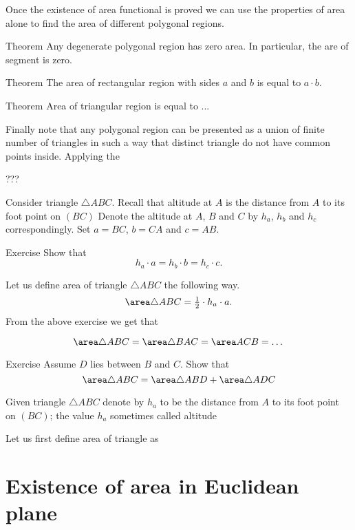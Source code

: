 Once the existence of area functional is proved we can use the properties of area alone to find the area of different polygonal regions.

\begin{thm}{Theorem}
Any degenerate polygonal region has zero area.
In particular, the are of segment is zero.
\end{thm}


\begin{thm}{Theorem}
The area of rectangular region with sides $a$ and $b$ is equal to $a\cdot b$. 
\end{thm}


\begin{thm}{Theorem}
Area of triangular region is equal to ...
\end{thm}

Finally note that any polygonal region can be presented as a union of finite number of triangles in such a way that distinct triangle do not have common points inside.
Applying the 

???

Consider triangle $\triangle ABC$.
Recall that altitude at $A$ is the distance from $A$ to its foot point on $(BC)$
Denote the altitude at $A$, $B$ and $C$ by $h_a$, $h_b$ and $h_c$ correspondingly.
Set $a=BC$, $b=CA$ and $c=AB$.

\begin{thm}{Exercise}
Show that 
$$h_a\cdot a=h_b\cdot b=h_c\cdot c.$$
\end{thm}


Let us define area of triangle $\triangle ABC$ the following way.
$$\area \triangle ABC= \tfrac12\cdot h_a\cdot a.
$$
From the above exercise we get that 

$$\area \triangle ABC=\area \triangle BAC=\area ACB=\dots$$


\begin{thm}{Exercise}
Assume $D$ lies between $B$ and $C$.
Show that 
$$\area \triangle ABC=\area \triangle ABD+\area \triangle ADC$$
\end{thm}



Given triangle $\triangle ABC$ denote by
$h_a$ to be the distance from $A$ to its foot point on $(BC)$;
the value $h_a$ sometimes called altitude 

Let us first define area of triangle as 


\section*{Existence of area in Euclidean plane}

